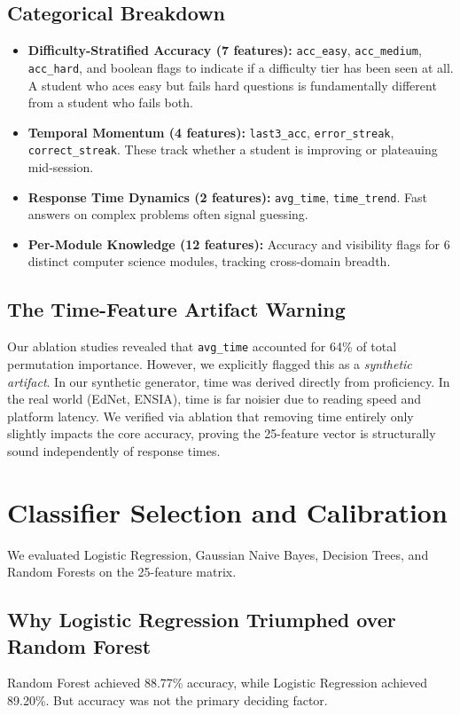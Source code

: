 \documentclass[11pt,a4paper]{article}
\begin{document}
\subsection{Categorical Breakdown}
\begin{itemize}[label=\textcolor{primaryblue}{\textbullet}]
    \item \textbf{Difficulty-Stratified Accuracy (7 features):} \texttt{acc\_easy}, \texttt{acc\_medium}, \texttt{acc\_hard}, and boolean flags to indicate if a difficulty tier has been seen at all. A student who aces easy but fails hard questions is fundamentally different from a student who fails both.
    \item \textbf{Temporal Momentum (4 features):} \texttt{last3\_acc}, \texttt{error\_streak}, \texttt{correct\_streak}. These track whether a student is improving or plateauing mid-session.
    \item \textbf{Response Time Dynamics (2 features):} \texttt{avg\_time}, \texttt{time\_trend}. Fast answers on complex problems often signal guessing.
    \item \textbf{Per-Module Knowledge (12 features):} Accuracy and visibility flags for 6 distinct computer science modules, tracking cross-domain breadth.
\end{itemize}

\subsection{The Time-Feature Artifact Warning}
Our ablation studies revealed that \texttt{avg\_time} accounted for 64\% of total permutation importance. However, we explicitly flagged this as a \textit{synthetic artifact}. In our synthetic generator, time was derived directly from proficiency. In the real world (EdNet, ENSIA), time is far noisier due to reading speed and platform latency. We verified via ablation that removing time entirely only slightly impacts the core accuracy, proving the 25-feature vector is structurally sound independently of response times.

\section{Classifier Selection and Calibration}
We evaluated Logistic Regression, Gaussian Naive Bayes, Decision Trees, and Random Forests on the 25-feature matrix. 

\subsection{Why Logistic Regression Triumphed over Random Forest}
Random Forest achieved 88.77\% accuracy, while Logistic Regression achieved 89.20\%. But accuracy was not the primary deciding factor. 
\end{document}
